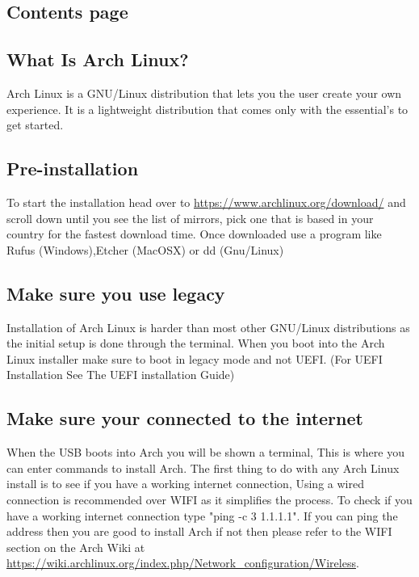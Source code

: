 \documentclass[titlepage]{article}
\begin{document}
\newpage
\begin{centering}
\section*{Contents page}
\end{centering}
\tableofcontents
\newpage
\begin{centering}
\section{What Is Arch Linux?}
     \end{centering}
     Arch Linux is a GNU/Linux distribution that lets you the user create your own experience. It is a lightweight distribution that comes only with the essential's to get started.
\newpage
\begin{centering}
\section{Pre-installation}
\end{centering}
   To start the installation head over to \url{https://www.archlinux.org/download/} and scroll down until you see the list of mirrors, pick one that is based in your country for the fastest download time. Once downloaded use a program like Rufus (Windows),Etcher (MacOSX) or dd (Gnu/Linux)\\
    \vspace*{0.5 cm}
   \subsection{Make sure you use legacy}
   Installation of Arch Linux is harder than most other GNU/Linux distributions as the initial setup is done through the terminal. When you boot into the Arch Linux installer make sure to boot in legacy mode and not UEFI. (For UEFI Installation See The UEFI installation Guide)\\
   \vspace*{0.5 cm}
   \subsection{Make sure your connected to the internet}
   When the USB boots into Arch you will be shown a terminal, This is where you can enter commands to install Arch. The first thing to do with any Arch Linux install is to see if you have a working internet connection, Using a wired connection is recommended over WIFI as it simplifies the process. To check if you have a working internet connection type "ping -c 3 1.1.1.1". If you can ping the address then you are good to install Arch if not then please refer to the WIFI section on the Arch Wiki at \url{https://wiki.archlinux.org/index.php/Network_configuration/Wireless}.
   \vspace*{0.5 cm}
\end{document}

